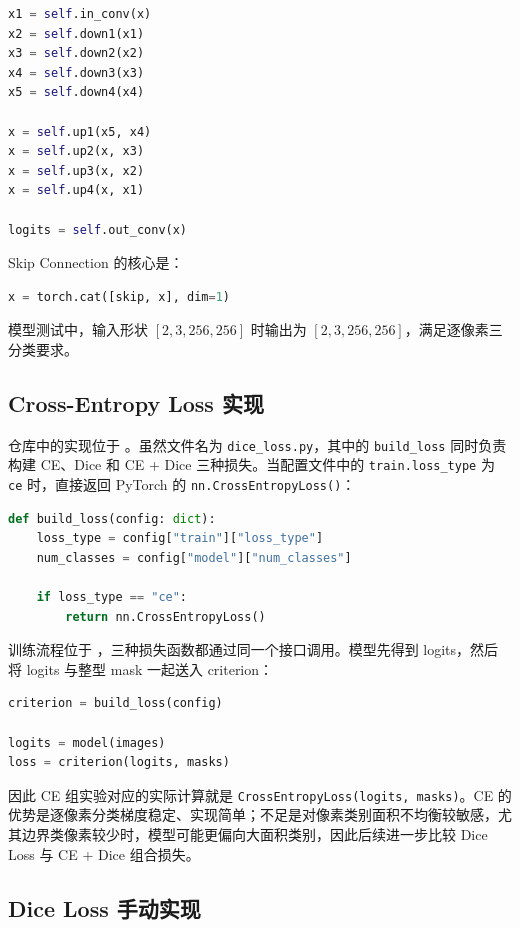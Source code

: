 \documentclass[UTF8,a4paper,12pt]{ctexart}
\begin{document}
\begin{lstlisting}[language=Python]
x1 = self.in_conv(x)
x2 = self.down1(x1)
x3 = self.down2(x2)
x4 = self.down3(x3)
x5 = self.down4(x4)

x = self.up1(x5, x4)
x = self.up2(x, x3)
x = self.up3(x, x2)
x = self.up4(x, x1)

logits = self.out_conv(x)
\end{lstlisting}

Skip Connection 的核心是：

\begin{lstlisting}[language=Python]
x = torch.cat([skip, x], dim=1)
\end{lstlisting}
模型测试中，输入形状 $[2,3,256,256]$ 时输出为 $[2,3,256,256]$，满足逐像素三分类要求。

\subsection{Cross-Entropy Loss 实现}

仓库中的实现位于 。虽然文件名为 \texttt{dice\_loss.py}，其中的 \texttt{build\_loss} 同时负责构建 CE、Dice 和 CE + Dice 三种损失。当配置文件中的 \texttt{train.loss\_type} 为 \texttt{ce} 时，直接返回 PyTorch 的 \texttt{nn.CrossEntropyLoss()}：

\begin{lstlisting}[language=Python]
def build_loss(config: dict):
    loss_type = config["train"]["loss_type"]
    num_classes = config["model"]["num_classes"]

    if loss_type == "ce":
        return nn.CrossEntropyLoss()
\end{lstlisting}

训练流程位于 ，三种损失函数都通过同一个接口调用。模型先得到 logits，然后将 logits 与整型 mask 一起送入 criterion：

\begin{lstlisting}[language=Python]
criterion = build_loss(config)

logits = model(images)
loss = criterion(logits, masks)
\end{lstlisting}

因此 CE 组实验对应的实际计算就是 \texttt{CrossEntropyLoss(logits, masks)}。CE 的优势是逐像素分类梯度稳定、实现简单；不足是对像素类别面积不均衡较敏感，尤其边界类像素较少时，模型可能更偏向大面积类别，因此后续进一步比较 Dice Loss 与 CE + Dice 组合损失。

\subsection{Dice Loss 手动实现}
\end{document}
